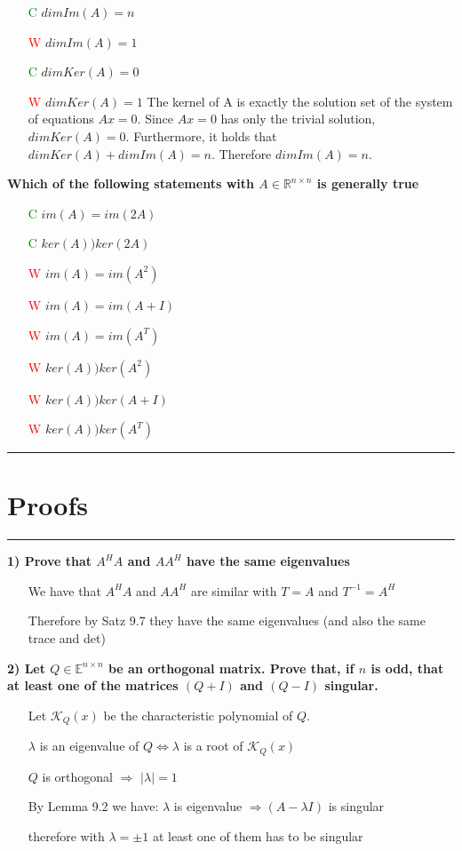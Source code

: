 \documentclass[7pt,landscape, margin = 0.1mm]{article}
\newcommand{\titellinie}{\rule{1.\linewidth}{0.75pt}}
\newcommand*{\mysection}[2][black]{\vskip 0pt \titellinie\vspace{-20pt}\section{#2}\vspace{-14pt}\titellinie \colorlet{chaptercolor}{#1}}
\begin{document}
\begin{multicols}{4}
\begin{flushleft}
\begin{itemize}
\item[\textcolor{green}{C}] $dim Im(A) = n$
\item[\textcolor{red}{W}]  $dim Im(A) = 1$
\item[\textcolor{green}{C}] $dim Ker (A) = 0$
\item[\textcolor{red}{W}] $dim Ker (A) = 1$
\textcolor{Emerald}{The kernel of A is exactly the solution set of the system of equations $Ax = 0$. Since
$Ax = 0$ has only the trivial solution, $dim Ker (A) = 0$. Furthermore, it holds that
$dim Ker (A) + dim Im(A) = n$.
Therefore $dim Im(A) = n$.}
\end{itemize}
\hspace{3mm}

\textbf{Which of the following statements with $A  \in \mathbb{R}^{n \times n} $ is generally true}
\begin{itemize}
\item[\textcolor{green}{C}] $im(A) = im(2A) $
\item[\textcolor{green}{C}] $ker(A) ) ker (2A)$
\item[\textcolor{red}{W}]  $im(A) = im(A^2) $
\item[\textcolor{red}{W}]  $im(A) = im(A+I) $
\item[\textcolor{red}{W}]  $im(A) = im(A^T) $
\item[\textcolor{red}{W}]  $ker(A) ) ker (A^2)$
\item[\textcolor{red}{W}] $ker(A) ) ker (A+I)$
\item[\textcolor{red}{W}] $ker(A) ) ker (A^T)$
\textcolor{Emerald}{}
\end{itemize}

\mysection[Gray]{\centering Proofs}



\textbf{1) Prove that $A^HA$ and $AA^H$ have the same eigenvalues}
\begin{itemize}
\item[] We have that  $A^HA$ and $AA^H$ are similar with  $T=A$ and $T^{-1}=A^H$
\item[] Therefore by Satz 9.7 they have the same eigenvalues (and also the same trace and det)
\end{itemize}

\textbf{2) Let $Q \in \mathbb{E}^{n \times n}$ be an orthogonal matrix. Prove that, if $n$ is odd, that at least one of the matrices $(Q+I) $ and $(Q-I) $ singular. }
\begin{itemize}
\item[] Let $\mathcal{K}_Q(x)$ be the characteristic polynomial of $Q$.
\item[] $ \lambda$ is an eigenvalue of $Q \Leftrightarrow  \lambda $ is a root of  $\mathcal{K}_Q(x)$ 
\item[] $Q$ is orthogonal $\Rightarrow $ $|\lambda|=1 $
\item[] By Lemma 9.2 we have: $\lambda $ is eigenvalue $ \Rightarrow (A- \lambda I )$ is singular
\item[] therefore with $\lambda = \pm 1 $ at least one of them has to be singular
\end{itemize}



\end{flushleft}
\end{multicols}
\end{document}

